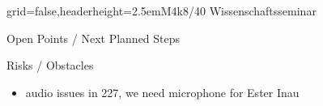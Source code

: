 \documentclass[english]{kiesgrube}
\begin{document}
\begin{poster}{grid=false,headerheight=2.5em}{}{M4k8/40 Wissenschaftsseminar}{}{}
\begin{posterbox}[name=open,column=0,below=event]{Open Points / Next Planned Steps}
\begin{itemize}
\end{itemize}
\end{posterbox}
\begin{posterbox}[name=risks,column=1,below=event]{Risks / Obstacles}
\begin{itemize}
\item audio issues in 227, we need microphone for Ester Inau
\end{itemize}
\end{posterbox}
\end{poster}
\end{document}
